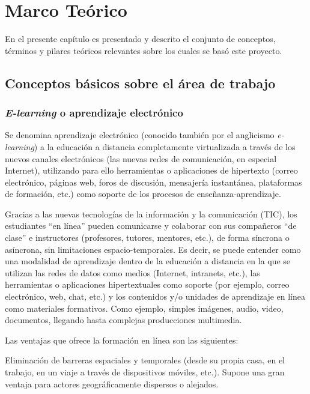 \chapter{Marco Teórico}
\thispagestyle{empty} %

En el presente capítulo es presentado y descrito el conjunto de conceptos, términos y pilares teóricos relevantes sobre los cuales se basó este proyecto.

\section{Conceptos básicos sobre el área de trabajo}

\subsection{\emph{E-learning} o aprendizaje electrónico}

Se denomina aprendizaje electrónico (conocido también por el anglicismo \emph{e-learning}) a la educación a distancia completamente virtualizada a través de los nuevos canales electrónicos (las nuevas redes de comunicación, en especial Internet), utilizando para ello herramientas o aplicaciones de hipertexto (correo electrónico, páginas web, foros de discusión, mensajería instantánea, plataformas de formación, etc.) como soporte de los procesos de enseñanza-aprendizaje\cite{bib:learning}. 

Gracias a las nuevas tecnologías de la información y la comunicación (TIC), los estudiantes ``en línea'' pueden comunicarse y colaborar con sus compañeros ``de clase'' e instructores (profesores, tutores, mentores, etc.), de forma síncrona o asíncrona, sin limitaciones espacio-temporales. Es decir, se puede entender como una modalidad de aprendizaje dentro de la educación a distancia en la que se utilizan las redes de datos como medios (Internet, intranets, etc.), las herramientas o aplicaciones hipertextuales como soporte (por ejemplo, correo electrónico, web, chat, etc.) y los contenidos y/o unidades de aprendizaje en línea como materiales formativos. Como ejemplo, simples imágenes, audio, video, documentos, llegando hasta complejas producciones multimedia.

Las ventajas que ofrece la formación en línea son las siguientes:

Eliminación de barreras espaciales y temporales (desde su propia casa, en el trabajo, en un viaje a través de dispositivos móviles, etc.). Supone una gran ventaja para actores geográficamente dispersos o alejados.

